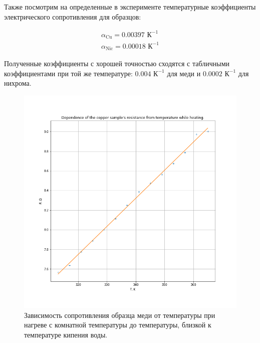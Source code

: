 \documentclass[a4paper, 12pt]{article}
\begin{document}
Также посмотрим на определенные в эксперименте температурные коэффициенты электрического сопротивления для образцов:

\begin{align*}
	\alpha_{\text{Cu}} = 0.00397 \text{ К}^{-1}\\
	\alpha_{\text{Nic}} = 0.00018 \text{ К}^{-1}
\end{align*}

Полученные коэффициенты с хорошей точностью сходятся с табличными коэффициентами при той же температуре: $0.004 \text{ К}^{-1}$ для меди и $0.0002 \text{ К}^{-1}$ для нихрома.

\begin{figure}[H]
	\centering
	\includegraphics[width=\linewidth]{1_Cu_Heating}
	\caption{Зависимость сопротивления образца меди от температуры при нагреве с комнатной температуры до температуры, близкой к температуре кипения воды.}
	\label{fig:1_Cu_Heating}
\end{figure}
\end{document}
